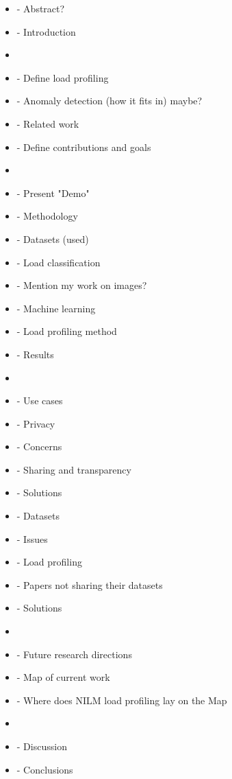 \documentclass[
11pt, %
english, %
singlespacing, %
headsepline, %
]{MastersDoctoralThesis} %
\begin{document}
\begin{itemize}
\item - Abstract?
\item - Introduction
\item
\item - Define load profiling
\item - Anomaly detection (how it fits in) maybe?
\item - Related work
\item - Define contributions and goals
\item
\item - Present "Demo"
\item - Methodology
\item 	- Datasets (used)
\item	- Load classification
\item		- Mention my work on images?
\item		- Machine learning
\item	- Load profiling method
\item - Results
\item
\item - Use cases
\item - Privacy
\item	- Concerns
\item 	- Sharing and transparency
\item	- Solutions
\item - Datasets
\item	- Issues 
\item		- Load profiling
\item		- Papers not sharing their datasets
\item 	- Solutions
\item
\item - Future research directions
\item	- Map of current work
\item	- Where does NILM load profiling lay on the Map
\item
\item- Discussion
\item- Conclusions
\end{itemize}




\end{document}
